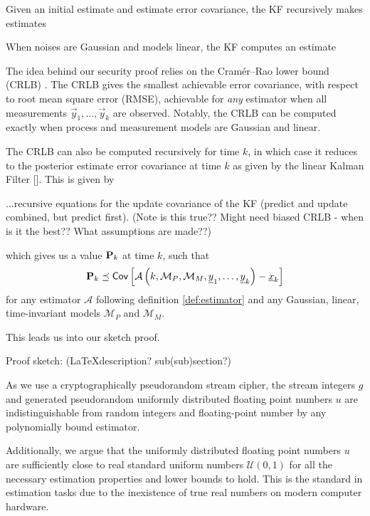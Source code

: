 \documentclass[letterpaper, 10 pt, conference]{IEEEtran}
\theoremstyle{definition}
\theoremstyle{definition}
\theoremstyle{remark}
\begin{document}
Given an initial estimate and estimate error covariance, the KF recursively makes estimates 


When noises are Gaussian and models linear, the KF computes an estimate


The idea behind our security proof relies on the Cramér–Rao lower bound (CRLB) \cite{haugBayesianEstimationTracking}. The CRLB gives the smallest achievable error covariance, with respect to root mean square error (RMSE), achievable for \textit{any} estimator when all measurements $\vec{y}_1,\dots,\vec{y}_k$ are observed. Notably, the CRLB can be computed exactly when process and measurement models are Gaussian and linear.


The CRLB can also be computed recursively for time $k$, in which case it reduces to the posterior estimate error covariance at time $k$ as given by the linear Kalman Filter []. This is given by


...recursive equations for the update covariance of the KF (predict and update combined, but predict first). (Note is this true?? Might need biased CRLB - when is it the best?? What assumptions are made??)

which gives us a value ${{\mathbf{P}}}_k$ at time $k$, such that
\begin{equation}
   {\ensuremath{{\mathbf{P}}}}_k \preceq \mathsf{Cov}\left[\mathcal{A}\left(k, \mathcal{M}_P, \mathcal{M}_M, {\underline{y}}_1,\dots,{\underline{y}}_k\right) - {\underline{x}}_k \right]
\end{equation}
for any estimator $\mathcal{A}$ following definition \ref{def:estimator} and any Gaussian, linear, time-invariant models $\mathcal{M}_P$ and $\mathcal{M}_M$.

This leads us into our sketch proof.

Proof sketch: (LaTeXdescription? sub(sub)section?)

As we use a cryptographically pseudorandom stream cipher, the stream integers $g$ and generated pseudorandom uniformly distributed floating point numbers $u$ are indistinguishable from random integers and floating-point number by any polynomially bound estimator. 

Additionally, we argue that the uniformly distributed floating point numbers $u$ are sufficiently close to real standard uniform numbers $\mathcal{U}(0,1)$ for all the necessary estimation properties and lower bounds to hold. This is the standard in estimation tasks due to the inexistence of true real numbers on modern computer hardware.
\end{document}
